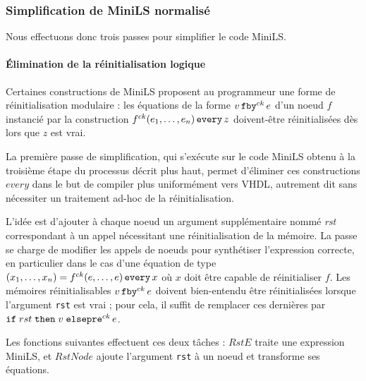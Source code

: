 \documentclass[a4paper]{article}
\newcommand{\mybox}[1]{\mbox{\tt{#1}}}
\newcommand{\Fby}[2]{#1 \, \mybox{fby}^{ck} \, #2}
\newcommand{\Pre}[1]{\mybox{pre}^{ck} \, #1}
\newcommand{\Every}[4]{#1^{ck}(#2,\dots,#3) \, \mybox{every} \, #4}
\newcommand{\If}[3]{\mybox{if} \; #1 \; \mybox{then} \; #2 \; \mybox{else} \; #3}
\begin{document}

\subsubsection{Simplification de MiniLS normalis\'e}

Nous effectuons donc trois passes pour simplifier le code MiniLS.

\paragraph{\'Elimination de la r\'einitialisation logique}

Certaines constructions de MiniLS proposent au programmeur une forme de
r\'einitialisation modulaire : les \'equations de la forme $\Fby{v}{e}$ d'un noeud
$f$ instanci\'e par la construction $\Every{f}{e_1}{e_n}{z}$ doivent-\^etre
r\'einitialis\'ees d\`es lors que $z$ est vrai.

La premi\`ere passe de simplification, qui s'ex\'ecute sur le code MiniLS obtenu \`a
la troisi\`eme \'etape du processus d\'ecrit plus haut, permet d'\'eliminer ces
constructions $every$ dans le but de compiler plus uniform\'ement vers VHDL,
autrement dit sans n\'ecessiter un traitement ad-hoc de la r\'einitialisation.

L'id\'ee est d'ajouter \`a chaque noeud un argument suppl\'ementaire nomm\'e
\textit{rst} correspondant \`a un appel n\'ecessitant une r\'einitialisation de la
m\'emoire. La passe se charge de modifier les appels de noeuds pour synth\'etiser
l'expression correcte, en particulier dans le cas d'une \'equation de type $(x_1,
\dots, x_n) = \Every{f}{e}{e}{x}$ o\`u $x$ doit \^etre capable de r\'einitialiser
$f$. Les m\'emoires r\'einitialisables $\Fby{v}{e}$ doivent bien-entendu \^etre
r\'einitialis\'ees lorsque l'argument \texttt{rst} est vrai ; pour cela, il suffit
de remplacer ces derni\`eres par $\If{rst}{v}{\newline \Pre{e}}$.

Les fonctions suivantes effectuent ces deux t\^aches : $RstE$ traite une
expression MiniLS, et $RstNode$ ajoute l'argument \texttt{rst} \`a un noeud et
transforme ses \'equations.

\newcommand{\re}[1]{RstE(#1)}
\newcommand{\rstn}[1]{RstNode(#1)}
\end{document}
